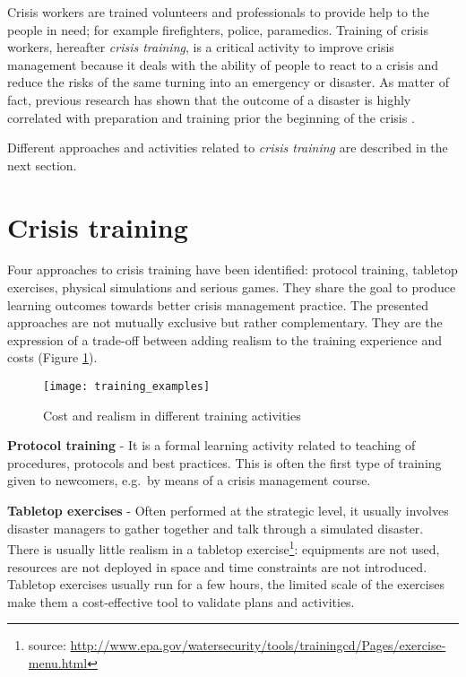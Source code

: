 Crisis workers are trained volunteers and professionals to provide help to the people in need; for example firefighters, police, paramedics. Training of crisis workers, hereafter \emph{crisis training}, is a critical activity to improve crisis management because it deals with the ability of people to react to a crisis and reduce the risks of the same turning into an emergency or disaster. As matter of fact, previous research has shown that the outcome of a disaster is highly correlated with preparation and training prior the beginning of the crisis \autocite{Asproth:cb}.

Different approaches and activities related to \emph{crisis training} are described in the next section.

\section{Crisis training}\label{crisis-training}

Four approaches to crisis training have been identified: protocol training, tabletop exercises, physical simulations and serious games. They share the goal to produce learning outcomes towards better crisis management practice. The presented approaches are not mutually exclusive but rather complementary. They are the expression of a trade-off between adding realism to the training experience and costs (Figure \ref{fig:training-activities}).

\begin{figure}
	[h!] \centering 
	\texttt{[image: training\_examples]} 
	\caption{Cost and realism in different training activities} 
	\label{fig:training-activities} 
\end{figure}

\textbf{Protocol training} - It is a formal learning activity related to teaching of procedures, protocols and best practices. This is often the first type of training given to newcomers, e.g.~by means of a crisis management course.

\textbf{Tabletop exercises} - Often performed at the strategic level, it usually involves disaster managers to gather together and talk through a simulated disaster. There is usually little realism in a tabletop exercise\footnote{source: \url{http://www.epa.gov/watersecurity/tools/trainingcd/Pages/exercise-menu.html}}: equipments are not used, resources are not deployed in space and time constraints are not introduced. Tabletop exercises usually run for a few hours, the limited scale of the exercises make them a cost-effective tool to validate plans and activities.

